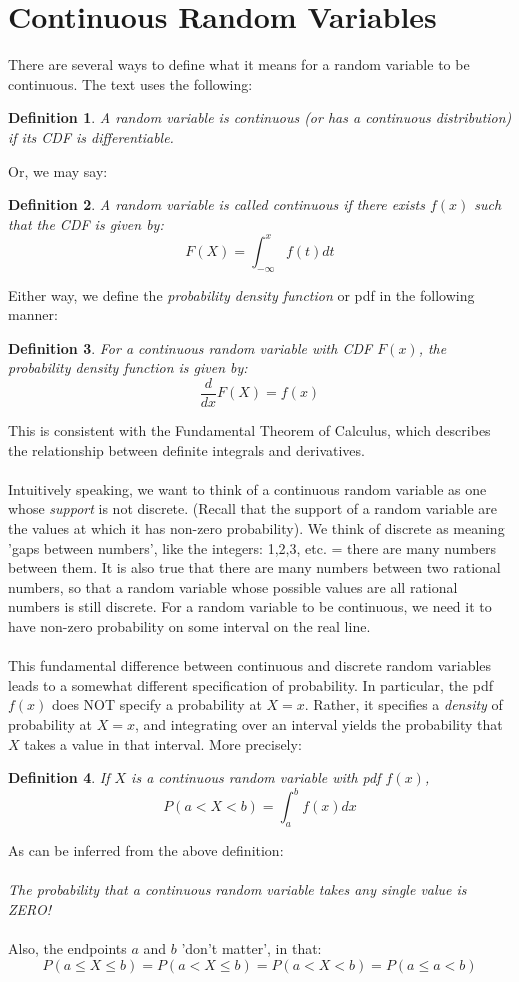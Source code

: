 \documentclass[12pt]{article} %
\newtheorem{defn}{Definition}
\begin{document}
\section{Continuous Random Variables}
There are several ways to define what it means for a random variable to be continuous. The text uses the following:
\begin{defn}
A random variable is continuous (or has a continuous distribution) if its CDF is differentiable.
\end{defn}
Or, we may say:
\begin{defn}
A random variable is called continuous if there exists $f(x)$ such that the CDF is given by:
$$F(X) = \int_{-\infty}^x f(t) dt$$
\end{defn}
Either way, we define the \emph{probability density function} or pdf in the following manner:
\begin{defn}
For a continuous random variable with CDF $F(x)$, the probability density function is given by:
$$\frac{d}{dx}F(X) = f(x)$$
\end{defn}
This is consistent with the Fundamental Theorem of Calculus, which describes the relationship between definite integrals and derivatives.\\\\
Intuitively speaking, we want to think of a continuous random variable as one whose \emph{support} is not discrete. (Recall that the support of a random variable are the values at which it has non-zero probability). We think of discrete as meaning 'gaps between numbers', like the integers: 1,2,3, etc. = there are many numbers between them. It is also true that there are many numbers between two rational numbers, so that a random variable whose possible values are all rational numbers is still discrete. For a random variable to be continuous, we need it to have non-zero probability on some interval on the real line.\\\\
This fundamental difference between continuous and discrete random variables leads to a somewhat different specification of probability. In particular, the pdf $f(x)$ does NOT specify a probability at $X=x$. Rather, it specifies a \emph{density} of probability at $X=x$, and integrating over an interval yields the probability that $X$ takes a value in that interval. More precisely:
\begin{defn}
If $X$ is a continuous random variable with pdf $f(x)$, 
$$P(a<X<b) = \int_a^b f(x) dx$$
\end{defn}
As can be inferred from the above definition:\\\\

\emph{The probability that a continuous random variable takes any single value is ZERO!}\\\\
Also, the endpoints $a$ and $b$ 'don't matter', in that:
$$P(a\leq X\leq b) = P(a<X\leq b)= P(a<X<b)= P(a\leq a<b)$$
\end{document}
